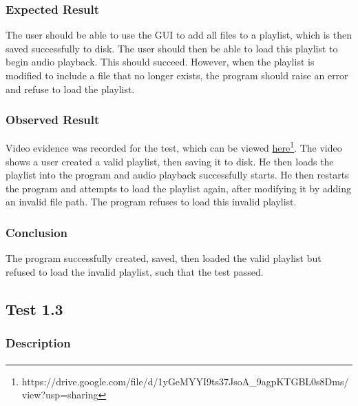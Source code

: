 \subsubsection{Expected Result}
The user should be able to use the GUI to add all files to a playlist, which is then saved successfully to disk. The user should then be able to load this playlist to begin audio playback. This should succeed. However, when the playlist is modified to include a file that no longer exists, the program should raise an error and refuse to load the playlist.

\subsubsection{Observed Result}
\label{sec:evidence1.2}
Video evidence was recorded for the test, which can be viewed \href{https://drive.google.com/file/d/1yGeMYYI9ts37JsoA_9agpKTGBL0s8Dms/view?usp=sharing}{here}\footnote{
	https://drive.google.com/file/d/1yGeMYYI9ts37JsoA\_9agpKTGBL0s8Dms/view?usp=sharing
}.  The video shows a user created a valid playlist, then saving it to disk. He then loads the playlist into the program and audio playback successfully starts. He then restarts the program and attempts to load the playlist again, after modifying it by adding an invalid file path. The program refuses to load this invalid playlist.

\subsubsection{Conclusion}
The program successfully created, saved, then loaded the valid playlist but refused to load the invalid playlist, such that the test passed.

\pagebreak
\subsection{Test 1.3}
\subsubsection{Description}
\paragraph{}
{
	\centering
}


